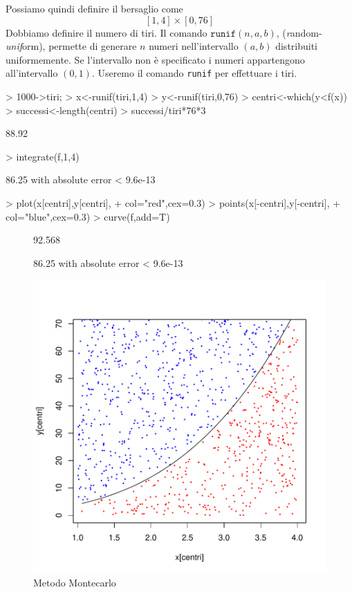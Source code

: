 \documentclass[onecolumn,11pt]{book}
\begin{document}
Possiamo quindi definire il bersaglio come
$$[1,4]\times [0,76]$$
Dobbiamo definire il numero di tiri.
Il comando $\texttt{runif}(n,a,b)$, ({\it r}andom-{\it unif}orm), permette di generare $n$ numeri nell'intervallo $(a,b)$ distribuiti uniformemente. Se l'intervallo non \`e specificato i numeri appartengono all'intervallo $(0,1)$.
Useremo il comando  \texttt{runif} per effettuare i tiri.

\par
\begin{Schunk}
\begin{Sinput}
> 1000->tiri;
> x<-runif(tiri,1,4)
> y<-runif(tiri,0,76)
> centri<-which(y<f(x))
> successi<-length(centri)
> successi/tiri*76*3
\end{Sinput}
\begin{Soutput}
[1] 88.92
\end{Soutput}
\begin{Sinput}
> integrate(f,1,4)
\end{Sinput}
\begin{Soutput}
86.25 with absolute error < 9.6e-13
\end{Soutput}
\begin{Sinput}
> plot(x[centri],y[centri],
+ col="red",cex=0.3)
> points(x[-centri],y[-centri],
+ col="blue",cex=0.3)
> curve(f,add=T)
\end{Sinput}
\end{Schunk}
\begin{figure}[htbp]
\begin{center}
\begin{Schunk}
\begin{Soutput}
[1] 92.568
\end{Soutput}
\begin{Soutput}
86.25 with absolute error < 9.6e-13
\end{Soutput}
\end{Schunk}
\includegraphics{RbookParte1-159}
\caption{Metodo Montecarlo }
\label{fig:Montec1}
\end{center}
\end{figure}
\end{document}
